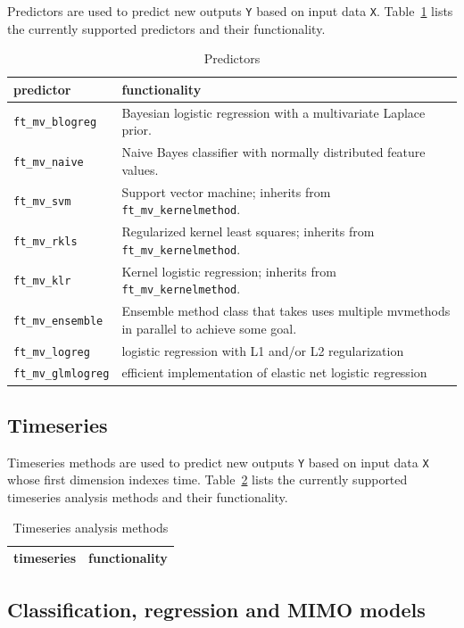 \documentclass{article}
\renewcommand{\t}[1]{{\tt #1}}
\begin{document}
Predictors are used to predict new outputs \t{Y} based on input data \t{X}. Table~\ref{predictors} lists the currently supported predictors and their functionality.

\begin{table}[ht]
\centering
\caption{Predictors}
\begin{tabular}{p{}|p{}}
\bf{predictor} & \bf{functionality}\\
\hline
\t{ft\_mv\_blogreg} & Bayesian logistic regression with a multivariate Laplace prior.\\
\t{ft\_mv\_naive} & Naive Bayes classifier with normally distributed feature values.\\
\t{ft\_mv\_svm} & Support vector machine; inherits from \t{ft\_mv\_kernelmethod}.\\
\t{ft\_mv\_rkls} & Regularized kernel least squares; inherits from \t{ft\_mv\_kernelmethod}.\\
\t{ft\_mv\_klr}  &  Kernel logistic regression;  inherits from \t{ft\_mv\_kernelmethod}.\\
\t{ft\_mv\_ensemble} & Ensemble method class that takes uses multiple mvmethods in parallel to achieve some goal.\\
\t{ft\_mv\_logreg} & logistic regression with L1 and/or L2 regularization\\
\t{ft\_mv\_glmlogreg} & efficient implementation of elastic net logistic regression
\end{tabular}
\label{predictors}
\end{table}

\subsection{Timeseries}

Timeseries methods are used to predict new outputs \t{Y} based on input data \t{X} whose first dimension indexes time. Table~\ref{timeseries} lists the currently supported timeseries analysis methods and their functionality.

\begin{table}[ht]
\centering
\caption{Timeseries analysis methods}
\begin{tabular}{p{}|p{}}
\bf{timeseries} & \bf{functionality}\\
\hline
\end{tabular}
\label{timeseries}
\end{table}

\subsection{Classification, regression and MIMO models}
\end{document}
